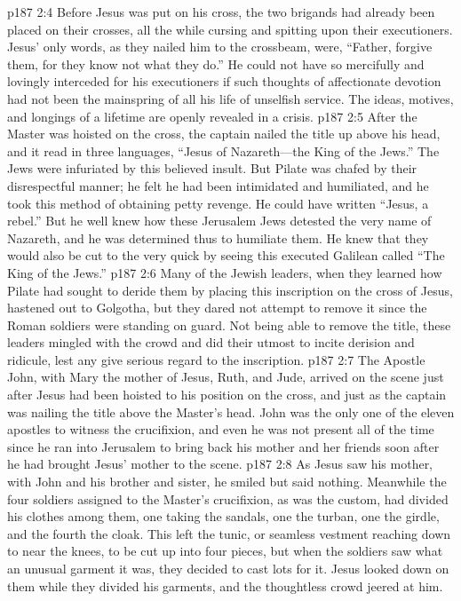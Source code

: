 \vs p187 2:4 Before Jesus was put on his cross, the two brigands had already been placed on their crosses, all the while cursing and spitting upon their executioners. Jesus’ only words, as they nailed him to the crossbeam, were, \textcolor{ubdarkred}{“Father, forgive them, for they know not what they do.”} He could not have so mercifully and lovingly interceded for his executioners if such thoughts of affectionate devotion had not been the mainspring of all his life of unselfish service. The ideas, motives, and longings of a lifetime are openly revealed in a crisis.
\vs p187 2:5 After the Master was hoisted on the cross, the captain nailed the title up above his head, and it read in three languages, “Jesus of Nazareth---the King of the Jews.” The Jews were infuriated by this believed insult. But Pilate was chafed by their disrespectful manner; he felt he had been intimidated and humiliated, and he took this method of obtaining petty revenge. He could have written “Jesus, a rebel.” But he well knew how these Jerusalem Jews detested the very name of Nazareth, and he was determined thus to humiliate them. He knew that they would also be cut to the very quick by seeing this executed Galilean called “The King of the Jews.”
\vs p187 2:6 Many of the Jewish leaders, when they learned how Pilate had sought to deride them by placing this inscription on the cross of Jesus, hastened out to Golgotha, but they dared not attempt to remove it since the Roman soldiers were standing on guard. Not being able to remove the title, these leaders mingled with the crowd and did their utmost to incite derision and ridicule, lest any give serious regard to the inscription.
\vs p187 2:7 The Apostle John, with Mary the mother of Jesus, Ruth, and Jude, arrived on the scene just after Jesus had been hoisted to his position on the cross, and just as the captain was nailing the title above the Master’s head. John was the only one of the eleven apostles to witness the crucifixion, and even he was not present all of the time since he ran into Jerusalem to bring back his mother and her friends soon after he had brought Jesus’ mother to the scene.
\vs p187 2:8 As Jesus saw his mother, with John and his brother and sister, he smiled but said nothing. Meanwhile the four soldiers assigned to the Master’s crucifixion, as was the custom, had divided his clothes among them, one taking the sandals, one the turban, one the girdle, and the fourth the cloak. This left the tunic, or seamless vestment reaching down to near the knees, to be cut up into four pieces, but when the soldiers saw what an unusual garment it was, they decided to cast lots for it. Jesus looked down on them while they divided his garments, and the thoughtless crowd jeered at him.

